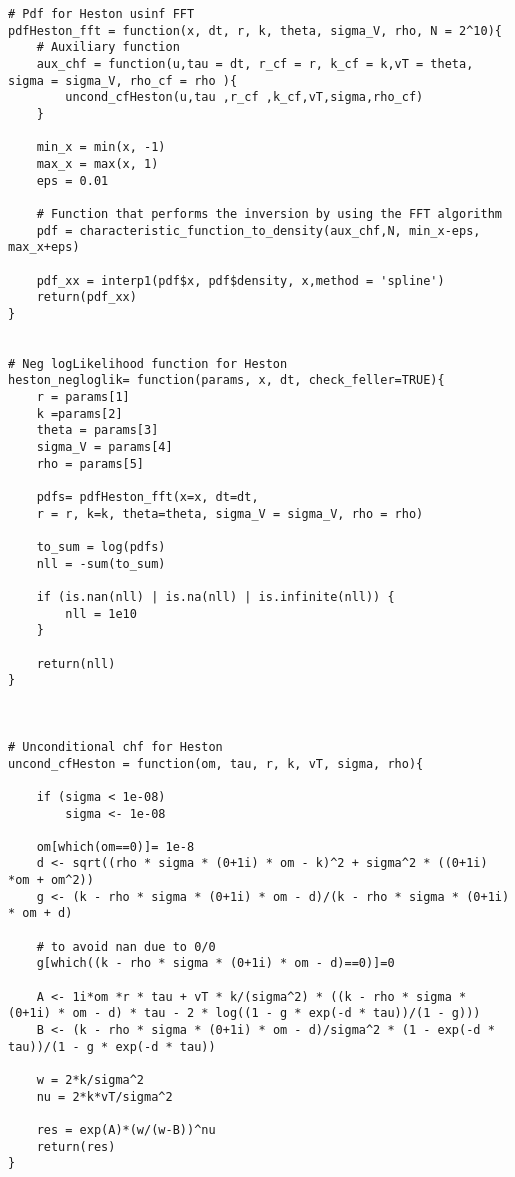 \begin{lstlisting}
# Pdf for Heston usinf FFT
pdfHeston_fft = function(x, dt, r, k, theta, sigma_V, rho, N = 2^10){
	# Auxiliary function
	aux_chf = function(u,tau = dt, r_cf = r, k_cf = k,vT = theta, sigma = sigma_V, rho_cf = rho ){
		uncond_cfHeston(u,tau ,r_cf ,k_cf,vT,sigma,rho_cf)
	}
	
	min_x = min(x, -1)
	max_x = max(x, 1)
	eps = 0.01
	
	# Function that performs the inversion by using the FFT algorithm
	pdf = characteristic_function_to_density(aux_chf,N, min_x-eps, max_x+eps)
	
	pdf_xx = interp1(pdf$x, pdf$density, x,method = 'spline')
	return(pdf_xx)
}


# Neg logLikelihood function for Heston
heston_negloglik= function(params, x, dt, check_feller=TRUE){
	r = params[1]
	k =params[2]
	theta = params[3]
	sigma_V = params[4]
	rho = params[5]
	
	pdfs= pdfHeston_fft(x=x, dt=dt,
	r = r, k=k, theta=theta, sigma_V = sigma_V, rho = rho)
	
	to_sum = log(pdfs)
	nll = -sum(to_sum)
	
	if (is.nan(nll) | is.na(nll) | is.infinite(nll)) {
		nll = 1e10
	}
	
	return(nll)
}



# Unconditional chf for Heston
uncond_cfHeston = function(om, tau, r, k, vT, sigma, rho){
	
	if (sigma < 1e-08) 
		sigma <- 1e-08
	
	om[which(om==0)]= 1e-8
	d <- sqrt((rho * sigma * (0+1i) * om - k)^2 + sigma^2 * ((0+1i) *om + om^2))
	g <- (k - rho * sigma * (0+1i) * om - d)/(k - rho * sigma * (0+1i) * om + d)
	
	# to avoid nan due to 0/0
	g[which((k - rho * sigma * (0+1i) * om - d)==0)]=0
	
	A <- 1i*om *r * tau + vT * k/(sigma^2) * ((k - rho * sigma * (0+1i) * om - d) * tau - 2 * log((1 - g * exp(-d * tau))/(1 - g)))
	B <- (k - rho * sigma * (0+1i) * om - d)/sigma^2 * (1 - exp(-d * tau))/(1 - g * exp(-d * tau))
	
	w = 2*k/sigma^2
	nu = 2*k*vT/sigma^2
	
	res = exp(A)*(w/(w-B))^nu
	return(res)
}
\end{lstlisting}

